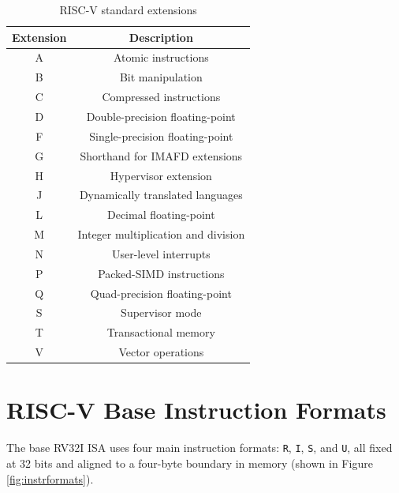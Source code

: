 \begin{table}
  \centering
  \begin{tabular}{|c|c|}
    \hline
    \textbf{Extension} & \textbf{Description}                \\
    \hline
    A                  & Atomic instructions                 \\
    \hline
    B                  & Bit manipulation                    \\
    \hline
    C                  & Compressed instructions             \\
    \hline
    D                  & Double-precision floating-point     \\
    \hline
    F                  & Single-precision floating-point     \\
    \hline
    G                  & Shorthand for IMAFD extensions      \\
    \hline
    H                  & Hypervisor extension                \\
    \hline
    J                  & Dynamically translated languages    \\
    \hline
    L                  & Decimal floating-point              \\
    \hline
    M                  & Integer multiplication and division \\
    \hline
    N                  & User-level interrupts               \\
    \hline
    P                  & Packed-SIMD instructions            \\
    \hline
    Q                  & Quad-precision floating-point       \\
    \hline
    S                  & Supervisor mode                     \\
    \hline
    T                  & Transactional memory                \\
    \hline
    V                  & Vector operations                   \\
    \hline
  \end{tabular}
  \caption{RISC-V standard extensions}
  \label{tab:extensions}
\end{table}

\section{RISC-V Base Instruction Formats}
\label{sec:riscv_bif}

The base RV32I ISA uses four main instruction formats: \texttt{R}, \texttt{I}, \texttt{S},
and \texttt{U}, all fixed at 32 bits and aligned to a four-byte boundary in memory
(shown in Figure \ref{fig:instrformats}).

